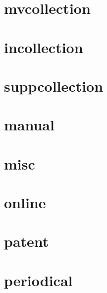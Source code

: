 \documentclass[a4paper]{article}
\begin{document}
\cite[1]{collection}

\section{mvcollection}

\cite[1]{mvcollection}

\cite[1]{mvcollection}

\section{incollection}

\cite[1]{incollection}

\cite[1]{incollection}

\section{suppcollection}

\cite[1]{suppcollection}

\cite[1]{suppcollection}

\section{manual}

\cite[1]{manual}

\cite[1]{manual}

\section{misc}

\cite[1]{misc}

\cite[1]{misc}

\section{online}

\cite[1]{online}

\cite[1]{online}

\section{patent}

\cite[1]{patent}

\cite[1]{patent}

\section{periodical}
\end{document}
